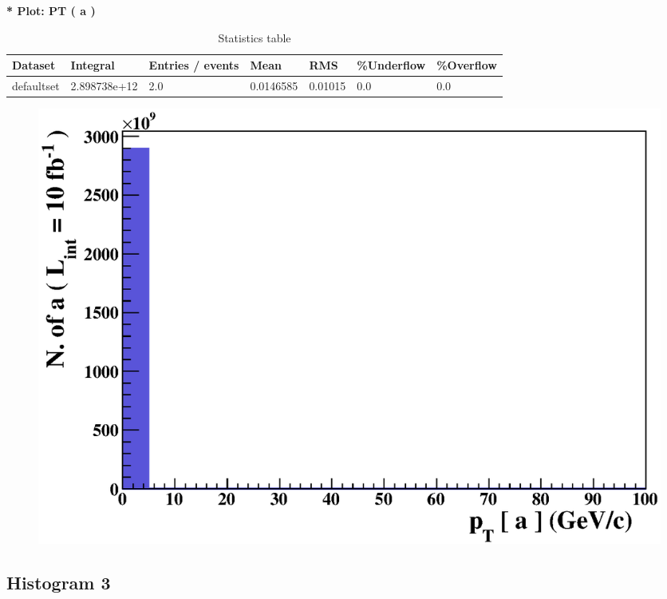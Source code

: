 \documentclass[a4paper, 11pt]{article}
\begin{document}
   \textbf{   * Plot: PT ( a ) }
\textbf{ }\begin{table}[!h]
  \begin{center}
    \caption{ Statistics table}
    \begin{tabular}{|m{17.0mm}|m{27.0mm}|m{23.0mm}|m{18.0mm}|m{18.0mm}|m{14.0mm}|m{14.0mm}|}
      \hline
      \cellcolor{yellow}         Dataset& \cellcolor{yellow}         Integral& \cellcolor{yellow}         Entries /\- events& \cellcolor{yellow}         Mean& \cellcolor{yellow}         RMS& \cellcolor{yellow}         \%Underflow& \cellcolor{yellow}         \%Overflow\\
      \hline
      \cellcolor{white}         defaultset& \cellcolor{white}         2.898738e+12& \cellcolor{white}         2.0& \cellcolor{white}         0.0146585& \cellcolor{white}         0.01015& \cellcolor{green}         0.0& \cellcolor{green}         0.0\\
\hline
    \end{tabular}
  \end{center}
\end{table}

\begin{figure}[!h]
  \begin{center}
    \includegraphics[scale=0.6]{selection_1.eps}\\
\caption{}
  \end{center}
\end{figure}
\newpage
   \newpage
\subsection{ Histogram 3}
\end{document}
